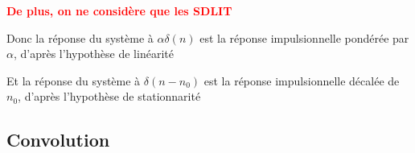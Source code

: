 \documentclass[a4paper,11pt]{beamer}
\begin{document}
\begin{frame}
\centering
\textbf{\textcolor{red}{De plus, on ne considère que les SDLIT}}
\vspace{1cm}

\justifying
Donc la réponse du système à $\alpha\delta(n)$ est la réponse impulsionnelle
pondérée par $\alpha$, d'après l'hypothèse de linéarité
\vspace{1cm}

\pause
Et la réponse du système à $\delta(n-n_0)$ est la réponse impulsionnelle décalée
de $n_0$, d'après l'hypothèse de stationnarité
\end{frame}

\subsection{Convolution}
\end{document}
